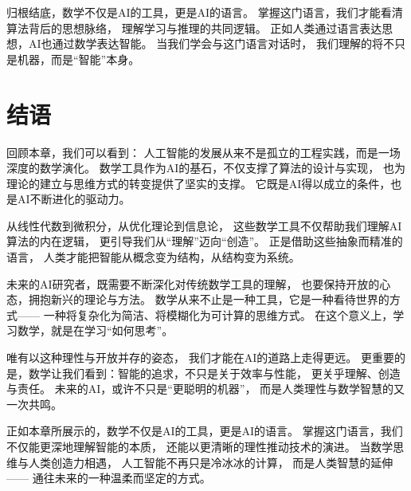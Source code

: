 归根结底，数学不仅是AI的工具，更是AI的语言。  
掌握这门语言，我们才能看清算法背后的思想脉络，  
理解学习与推理的共同逻辑。  
正如人类通过语言表达思想，AI也通过数学表达智能。  
当我们学会与这门语言对话时，  
我们理解的将不只是机器，而是“智能”本身。

\section{结语}

回顾本章，我们可以看到：  
人工智能的发展从来不是孤立的工程实践，而是一场深度的数学演化。  
数学工具作为AI的基石，不仅支撑了算法的设计与实现，  
也为理论的建立与思维方式的转变提供了坚实的支撑。  
它既是AI得以成立的条件，也是AI不断进化的驱动力。

从线性代数到微积分，从优化理论到信息论，  
这些数学工具不仅帮助我们理解AI算法的内在逻辑，  
更引导我们从“理解”迈向“创造”。  
正是借助这些抽象而精准的语言，  
人类才能把智能从概念变为结构，从结构变为系统。

未来的AI研究者，既需要不断深化对传统数学工具的理解，  
也要保持开放的心态，拥抱新兴的理论与方法。  
数学从来不止是一种工具，它是一种看待世界的方式——  
一种将复杂化为简洁、将模糊化为可计算的思维方式。  
在这个意义上，学习数学，就是在学习“如何思考”。

唯有以这种理性与开放并存的姿态，  
我们才能在AI的道路上走得更远。  
更重要的是，数学让我们看到：智能的追求，不只是关于效率与性能，  
更关乎理解、创造与责任。  
未来的AI，或许不只是“更聪明的机器”，  
而是人类理性与数学智慧的又一次共鸣。

正如本章所展示的，数学不仅是AI的工具，更是AI的语言。  
掌握这门语言，我们不仅能更深地理解智能的本质，  
还能以更清晰的理性推动技术的演进。  
当数学思维与人类创造力相遇，  
人工智能不再只是冷冰冰的计算，  
而是人类智慧的延伸——  
通往未来的一种温柔而坚定的方式。

\nocite{*}
